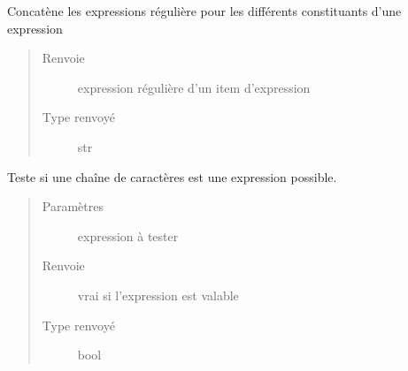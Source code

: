 \documentclass[letterpaper,10pt,french]{sphinxmanual}
\begin{document}
\begin{fulllineitems}
\begin{fulllineitems}
\begin{quote}
\begin{description}
\end{description}\end{quote}

\end{fulllineitems}


\begin{fulllineitems}
\label{\detokenize{expressionparser:expressionparser.ExpressionParser.regex}}
Concatène les expressions régulière pour les différents constituants d’une expression
\begin{quote}\begin{description}
\item[{Renvoie}] \leavevmode
expression régulière d’un item d’expression

\item[{Type renvoyé}] \leavevmode
str

\end{description}\end{quote}

\end{fulllineitems}


\begin{fulllineitems}
\label{\detokenize{expressionparser:expressionparser.ExpressionParser.strIsExpression}}
Teste si une chaîne de caractères est une expression possible.
\begin{quote}\begin{description}
\item[{Paramètres}] \leavevmode
{} \textendash{} expression à tester

\item[{Renvoie}] \leavevmode
vrai si l’expression est valable

\item[{Type renvoyé}] \leavevmode
bool


\end{description}
\end{quote}
\end{fulllineitems}
\end{fulllineitems}
\end{document}
